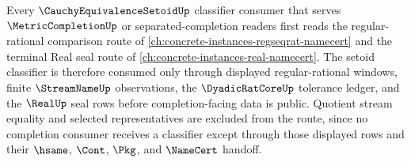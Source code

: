 Every $\CauchyEquivalenceSetoidUp$ classifier consumer that serves $\MetricCompletionUp$ or separated-completion readers first reads the regular-rational comparison route of \autoref{ch:concrete-instances-regseqrat-namecert} and the terminal Real seal route of \autoref{ch:concrete-instances-real-namecert}. The setoid classifier is therefore consumed only through displayed regular-rational windows, finite $\StreamNameUp$ observations, the $\DyadicRatCoreUp$ tolerance ledger, and the $\RealUp$ seal rows before completion-facing data is public. Quotient stream equality and selected representatives are excluded from the route, since no completion consumer receives a classifier except through those displayed rows and their $\hsame$, $\Cont$, $\Pkg$, and $\NameCert$ handoff.
